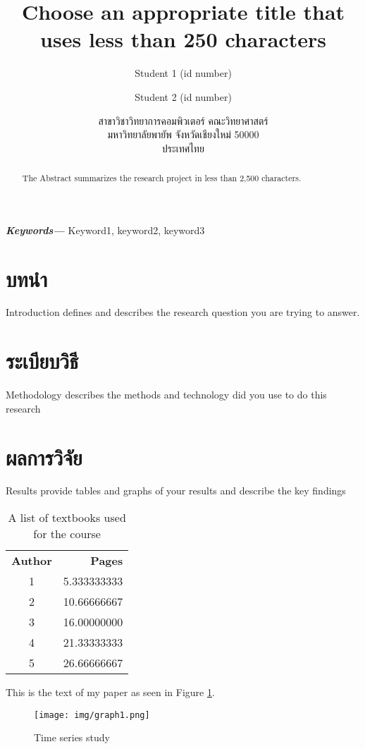 \documentclass[10pt,twocolumn,twoside,a4paper]{article}
\title{Choose an appropriate title that uses less than 250 characters}
\author{Student 1 (id number)\and
Student 2 (id number)}%
\date{สาขาวิชาวิทยาการคอมพิวเตอร์ คณะวิทยาศาสตร์\\
    มหาวิทยาลัยพายัพ จังหวัดเชียงใหม่ 50000\\
    ประเทศไทย}
\providecommand{\keywords}[1]{\noindent\textbf{\textit{Keywords---}} #1}
\begin{document}
\thispagestyle{empty}%
\maketitle

\begin{abstract}
The Abstract summarizes the research project in less than 2,500 characters.
\end{abstract}

\bigskip
\keywords{Keyword1, keyword2, keyword3}

\section{บทนำ}
\label{introduction}
Introduction defines and describes the research question you are trying to answer.

\section{ระเบียบวิธี}
\label{methodology}
Methodology describes the methods and technology did you use to do this research


\section{ผลการวิจัย}
\label{results}
Results provide tables and graphs of your results and describe the key findings

\begin{table}[htb]
\caption{A list of textbooks used for the course}
\label{textbookList}
\medskip
\centering
\small
\begin{tabular}{cr}
\textbf{Author} & \textbf{Pages} \\
1 &	5.333333333 \\
2 &	10.66666667 \\
3 &	16.00000000 \\
4 &	21.33333333 \\
5 &	26.66666667 \\
\end{tabular}
\end{table}

This is the text of my paper as seen in Figure \ref{fig_graph1}.

\begin{figure}[htb]
\centering
\texttt{[image: img/graph1.png]}
\caption{Time series study}
\label{fig_graph1}
\end{figure}
\end{document}
